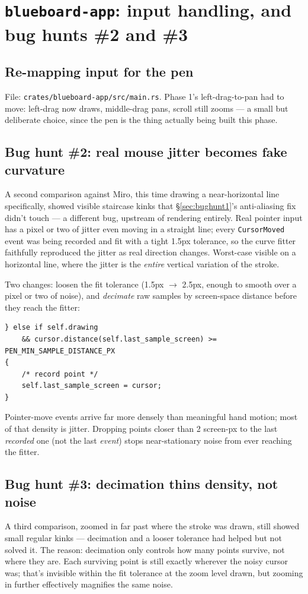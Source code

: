 \documentclass[11pt]{article}
\begin{document}
\section{\texttt{blueboard-app}: input handling, and bug hunts \#2 and \#3}

\subsection{Re-mapping input for the pen}
File: \texttt{crates/blueboard-app/src/main.rs}. Phase 1's left-drag-to-pan had to move:
left-drag now draws, middle-drag pans, scroll still zooms — a small but deliberate choice,
since the pen is the thing actually being built this phase.

\subsection{Bug hunt \#2: real mouse jitter becomes fake curvature}
\label{sec:bughunt2}
A second comparison against Miro, this time drawing a near-horizontal line specifically,
showed visible staircase kinks that \S\ref{sec:bughunt1}'s anti-aliasing fix didn't touch
— a different bug, upstream of rendering entirely. Real pointer input has a pixel or two
of jitter even moving in a straight line; every \texttt{CursorMoved} event was being
recorded and fit with a tight 1.5px tolerance, so the curve fitter faithfully reproduced
the jitter as real direction changes. Worst-case visible on a horizontal line, where the
jitter is the \emph{entire} vertical variation of the stroke.

Two changes: loosen the fit tolerance (1.5px $\to$ 2.5px, enough to smooth over a pixel or
two of noise), and \emph{decimate} raw samples by screen-space distance before they reach
the fitter:
\begin{lstlisting}
} else if self.drawing
    && cursor.distance(self.last_sample_screen) >= PEN_MIN_SAMPLE_DISTANCE_PX
{
    /* record point */
    self.last_sample_screen = cursor;
}
\end{lstlisting}
Pointer-move events arrive far more densely than meaningful hand motion; most of that
density is jitter. Dropping points closer than 2 screen-px to the last \emph{recorded}
one (not the last \emph{event}) stops near-stationary noise from ever reaching the fitter.

\subsection{Bug hunt \#3: decimation thins density, not noise}
A third comparison, zoomed in far past where the stroke was drawn, still showed small
regular kinks — decimation and a looser tolerance had helped but not solved it. The
reason: decimation only controls how many points survive, not where they are. Each
surviving point is still exactly wherever the noisy cursor was; that's invisible within
the fit tolerance at the zoom level drawn, but zooming in further effectively magnifies
the same noise.
\end{document}
